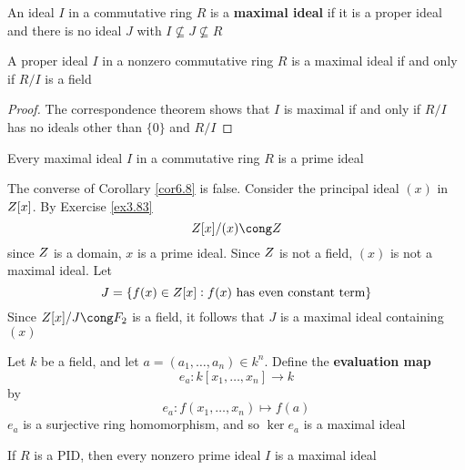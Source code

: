 \documentclass[11pt]{article}
\begin{document}
\begin{definition}[]
An ideal \(I\) in a commutative ring \(R\) is a \textbf{maximal ideal} if it is a proper
ideal and there is no ideal \(J\) with \(I\not\subseteq J\not\subseteq R\)
\end{definition}

\begin{proposition}[]
A proper ideal \(I\) in a nonzero commutative ring \(R\) is a maximal ideal if
and only if \(R/I\) is a field
\end{proposition}

\begin{proof}
The correspondence theorem shows that \(I\) is maximal if and only if \(R/I\)
has no ideals other than \(\{0\}\) and \(R/I\)
\end{proof}

\begin{corollary}[]
\label{cor6.8}
Every maximal ideal \(I\) in a commutative ring \(R\) is a prime ideal
\end{corollary}

\begin{examplle}[]
The converse of Corollary \ref{cor6.8} is false. Consider the principal ideal
\((x)\) in \(\relax{Z}[x]\). By Exercise \ref{ex3.83}
\begin{equation*}
\Z[x]/(x)\cong\Z
\end{equation*}
since \(\relax{Z}\) is a domain, \(x\) is a prime ideal. Since \(\relax{Z}\) is not a field,
\((x)\) is not a maximal ideal. Let 
\begin{equation*}
J=\{f(x)\in\relax{Z}[x]:f(x)\text{ has even constant term}\}
\end{equation*}
Since \(\Z[x]/J\cong\F_2\) is a field, it follows that \(J\) is a maximal ideal
containing \((x)\)
\end{examplle}

\begin{examplle}[]
Let \(k\) be a field, and let \(a=(a_1,\dots,a_n)\in k^n\). Define the
\textbf{evaluation map}
\begin{equation*}
e_a:k[x_1,\dots,x_n]\to k
\end{equation*}
by
\begin{equation*}
e_a:f(x_1,\dots,x_n)\mapsto f(a)
\end{equation*}
\(e_a\) is a surjective ring homomorphism, and so \(\ker e_a\) is a maximal
ideal
\end{examplle}

\begin{theorem}[]
If \(R\) is a PID, then every nonzero prime ideal \(I\) is a maximal ideal
\end{theorem}
\end{document}
